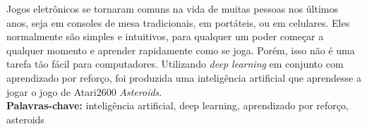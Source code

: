 Jogos eletrônicos se tornaram comuns na vida de muitas pessoas nos últimos anos, seja em consoles de mesa tradicionais, em portáteis, ou em celulares.
Eles normalmente são simples e intuitivos, para qualquer um poder começar a qualquer momento e aprender rapidamente como se joga.
Porém, isso não é uma tarefa tão fácil para computadores.
Utilizando \textit{deep learning} em conjunto com aprendizado por reforço, foi produzida uma inteligência artificial que aprendesse a jogar o jogo de Atari2600 \textit{Asteroids}.
\\

\noindent%
\textbf{Palavras-chave:} inteligência artificial, deep learning, aprendizado por reforço, asteroids

%
%
